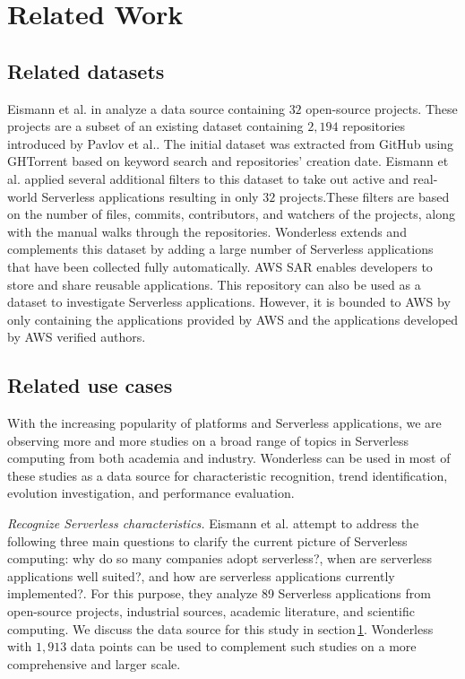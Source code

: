 \section{Related Work}
\label{relatedwork}

\subsection{Related datasets}
Eismann et al. in \cite{eismann2020serverless} analyze a data source 
containing $32$ open-source projects. These projects are a subset of 
an existing dataset containing $2,194$ repositories introduced by 
Pavlov et al.\cite{pavlov2019serverless}. The initial dataset was extracted 
from GitHub using GHTorrent based on keyword search and repositories' 
creation date. Eismann et al. applied several additional filters to this dataset 
to take out active and real-world Serverless applications resulting in only $32$
projects.These filters are based on the number of files, commits, 
contributors, and watchers of the projects, along with the manual walks 
through the repositories. Wonderless extends and complements 
this dataset by adding a large number of Serverless applications that 
have been collected fully automatically.
AWS SAR enables developers to store and share reusable applications. 
This repository can also be used as a dataset to investigate Serverless 
applications. However, it is bounded to AWS by only containing the 
applications provided by AWS and the applications developed by 
AWS verified authors.

\subsection{Related use cases}
With the increasing popularity of \faas platforms and Serverless applications, 
we are observing more and more studies on a broad range of topics in 
Serverless computing from both academia and industry. Wonderless can 
be used in most of these studies as a data source for characteristic recognition, 
trend identification, evolution investigation, and performance evaluation.

\emph{Recognize Serverless characteristics.}
Eismann et al.\cite{eismann2020serverless} attempt to address the following 
three main questions to clarify the current picture of Serverless computing: 
why do so many companies adopt serverless?, when are serverless applications 
well suited?, and how are serverless applications currently implemented?. For this 
purpose, they analyze 89 Serverless applications from open-source projects, 
industrial sources, academic literature, and scientific computing. We discuss 
the data source for this study in section\,\ref{relatedwork}. Wonderless with 
$1,913$ data points can be used to complement such studies on a more 
comprehensive and larger scale.

